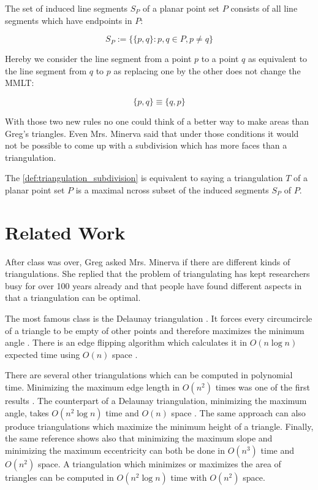 \begin{definition}\label{def:induced_segments}
The set of induced line segments \(S_P\) of a planar point set \(P\)
consists of all line segments which have endpoints in \(P\):

\[ S_P := \{\{p,q\} : p,q\in P, p\neq q\} \]

Hereby we consider the line segment from a point \(p\) to a point
\(q\) as equivalent to the line segment from \(q\) to \(p\) as 
replacing one by the other does not change the \gls{MMLT}:

\[ \{p, q\} \equiv \{q, p\} \]
\end{definition}

With those two new rules no one could think of a better way to make
areas than Greg's triangles. Even Mrs. Minerva said that under those
conditions it would not be possible to come up with a subdivision
which has more faces than a triangulation.

\begin{definition}[Triangulation]\label{def:triangulation}
The \cref{def:triangulation_subdivision} is equivalent to saying
a triangulation \(T\) of a planar point set \(P\) is a maximal
\gls{ncross} subset of the induced segments \(S_P\) of \(P\).
\end{definition}

\section{Related Work}
After class was over, Greg asked Mrs. Minerva if there are different
kinds of triangulations. She replied that the problem of 
triangulating has kept researchers busy for over 100 years already
\cite{triangulation_hilbert} and that people have found different
aspects in that a triangulation can be optimal.

The most famous class is the Delaunay triangulation
\cite[Section 9.2]{deberg_compgeom}. It forces every circumcircle
of a triangle to be empty of other points and therefore maximizes
the minimum angle \cite[Theorem 9.9]{deberg_compgeom}. There is an
edge flipping algorithm which calculates it in \(O(n \log n)\) 
expected time using \(O(n)\) space 
\cite[Theorem 9.12]{deberg_compgeom}.

There are several other triangulations which can be computed in
polynomial time. Minimizing the maximum edge length in \(O(n^2)\)
times was one of the first results \cite{triangulation_minmax_length}.
The counterpart of a Delaunay triangulation, 
minimizing the maximum angle, takes \(O(n^2 \log n)\) time and
\(O(n)\) space \cite{triangulation_edge_insertion}. The same
approach can also produce triangulations which maximize the minimum 
height of a triangle. Finally, the same reference shows also that 
minimizing the maximum slope and minimizing the maximum eccentricity 
can both be done in \(O(n^3)\) time and \(O(n^2)\) space. A 
triangulation which minimizes or maximizes the area of triangles can
be computed in \(O(n^2 \log n)\) time with \(O(n^2)\) space.
\cite{triangulation_area}

